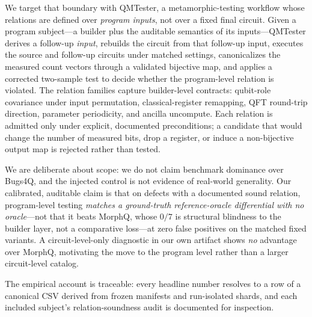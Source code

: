 We target that boundary with QMTester, a metamorphic-testing workflow whose relations are defined over \emph{program inputs}, not over a fixed final circuit. Given a program subject---a builder plus the auditable semantics of its inputs---QMTester derives a follow-up \emph{input}, rebuilds the circuit from that follow-up input, executes the source and follow-up circuits under matched settings, canonicalizes the measured count vectors through a validated bijective map, and applies a corrected two-sample test to decide whether the program-level relation is violated. The relation families capture builder-level contracts: qubit-role covariance under input permutation, classical-register remapping, QFT round-trip direction, parameter periodicity, and ancilla uncompute. Each relation is admitted only under explicit, documented preconditions; a candidate that would change the number of measured bits, drop a register, or induce a non-bijective output map is rejected rather than tested.

We are deliberate about scope: we do not claim benchmark dominance over Bugs4Q, and the injected control is not evidence of real-world generality. Our calibrated, auditable claim is that on defects with a documented sound relation, program-level testing \emph{matches a ground-truth reference-oracle differential with no oracle}---not that it beats MorphQ, whose $0/7$ is structural blindness to the builder layer, not a comparative loss---at zero false positives on the matched fixed variants. A circuit-level-only diagnostic in our own artifact shows \emph{no} advantage over MorphQ, motivating the move to the program level rather than a larger circuit-level catalog.

The empirical account is traceable: every headline number resolves to a row of a canonical CSV derived from frozen manifests and run-isolated shards, and each included subject's relation-soundness audit is documented for inspection.

